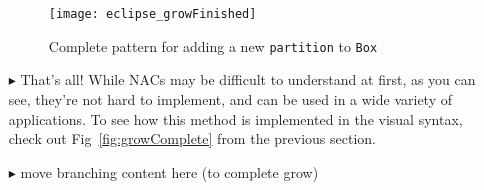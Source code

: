 \begin{itemize}
\begin{figure}[htp]
\begin{center}
  \texttt{[image: eclipse\_growFinished]}
  \caption{Complete pattern for adding a new \texttt{partition} to \texttt{Box}}
  \label{fig:patternComplete}
\end{center}
\end{figure}

\vspace{0.5cm}

\item[$\blacktriangleright$] That's all! While NACs may be difficult to understand at first, as you can see, they're not hard to implement, and
can be used in a wide variety of applications. To see how this method is implemented in the visual syntax, check out Fig~\ref{fig:growComplete} from the previous
section.

\item[$\blacktriangleright$] \update move branching content here (to complete grow)

\end{itemize}